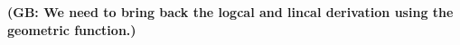 \documentclass[useAMS,usenatbib]{mn2e}
\newcommand{\bs}{\bmath{s}}
\newcommand{\bJ}{\bmath{J}}
\newcommand{\conj}[1]{\overline{#1}}
\begin{document}
{\bf (GB: We need to bring back the logcal and lincal derivation using the geometric function.)}
%
% 
\end{document}
